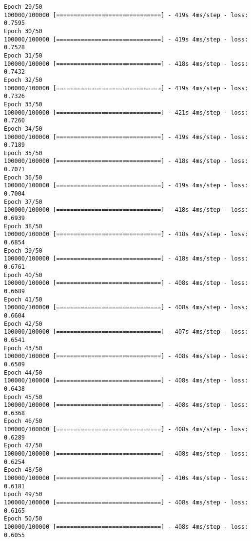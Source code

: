 \documentclass[11pt]{article}
\begin{document}
\begin{Verbatim}[commandchars=\\\{\}]
Epoch 29/50
100000/100000 [==============================] - 419s 4ms/step - loss: 0.7595
Epoch 30/50
100000/100000 [==============================] - 419s 4ms/step - loss: 0.7528
Epoch 31/50
100000/100000 [==============================] - 418s 4ms/step - loss: 0.7432
Epoch 32/50
100000/100000 [==============================] - 419s 4ms/step - loss: 0.7326
Epoch 33/50
100000/100000 [==============================] - 421s 4ms/step - loss: 0.7260
Epoch 34/50
100000/100000 [==============================] - 419s 4ms/step - loss: 0.7189
Epoch 35/50
100000/100000 [==============================] - 418s 4ms/step - loss: 0.7071
Epoch 36/50
100000/100000 [==============================] - 419s 4ms/step - loss: 0.7004
Epoch 37/50
100000/100000 [==============================] - 418s 4ms/step - loss: 0.6939
Epoch 38/50
100000/100000 [==============================] - 418s 4ms/step - loss: 0.6854
Epoch 39/50
100000/100000 [==============================] - 418s 4ms/step - loss: 0.6761
Epoch 40/50
100000/100000 [==============================] - 408s 4ms/step - loss: 0.6689
Epoch 41/50
100000/100000 [==============================] - 408s 4ms/step - loss: 0.6604
Epoch 42/50
100000/100000 [==============================] - 407s 4ms/step - loss: 0.6541
Epoch 43/50
100000/100000 [==============================] - 408s 4ms/step - loss: 0.6509
Epoch 44/50
100000/100000 [==============================] - 408s 4ms/step - loss: 0.6438
Epoch 45/50
100000/100000 [==============================] - 408s 4ms/step - loss: 0.6368
Epoch 46/50
100000/100000 [==============================] - 408s 4ms/step - loss: 0.6289
Epoch 47/50
100000/100000 [==============================] - 408s 4ms/step - loss: 0.6254
Epoch 48/50
100000/100000 [==============================] - 410s 4ms/step - loss: 0.6181
Epoch 49/50
100000/100000 [==============================] - 408s 4ms/step - loss: 0.6165
Epoch 50/50
100000/100000 [==============================] - 408s 4ms/step - loss: 0.6055

    \end{Verbatim}
\end{document}
